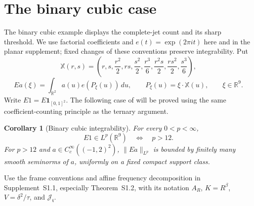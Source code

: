 \documentclass[11pt]{amsart}
\newtheorem{corollary}[theorem]{Corollary}
\theoremstyle{definition}
\theoremstyle{remark}
\newcommand{\R}{\mathbb R}
\numberwithin{equation}{section}
\begin{document}
\section{The binary cubic case}\label{pl:section}
The binary cubic example displays the complete-jet count and its sharp threshold. We use factorial coefficients and $e(t)=\exp(2\pi i t)$ here and in the planar supplement; fixed changes of these conventions preserve integrability. Put
\begin{equation}\label{pl:moment-surface}
\mathbb X(r,s)=\left(r,s,\frac{r^2}{2},rs,\frac{s^2}{2},\frac{r^3}{6},\frac{r^2s}{2},\frac{rs^2}{2},\frac{s^3}{6}\right),
\end{equation}
\begin{equation}\label{pl:extension}
Ea(\xi)=\int_{\R^2}a(u)e(P_\xi(u))\,du,\qquad P_\xi(u)=\xi\cdot\mathbb X(u),\qquad \xi\in\R^9.
\end{equation}
Write $E1=E\mathbf1_{[0,1]^2}$. The following case of \cite[Theorem 1.2]{BGZZK} will be proved using the same coefficient-counting principle as the ternary argument.
\begin{corollary}[Binary cubic integrability]\label{pl:main}
For every $0<p<\infty$,
\begin{equation}\label{pl:main-equivalence}
E1\in L^p(\R^9)\quad\Longleftrightarrow\quad p>12.
\end{equation}
For $p>12$ and $a\in C_c^\infty((-1,2)^2)$, $\|Ea\|_{L^p}$ is bounded by finitely many smooth seminorms of $a$, uniformly on a fixed compact support class.
\end{corollary}

Use the frame conventions and affine frequency decomposition in Supplement~S1.1, especially Theorem~S1.2, with its notation $A_R$, $K=R^\beta$, $V=\delta^2/\tau$, and $\mathcal J_{\mathfrak t}$.
\end{document}
